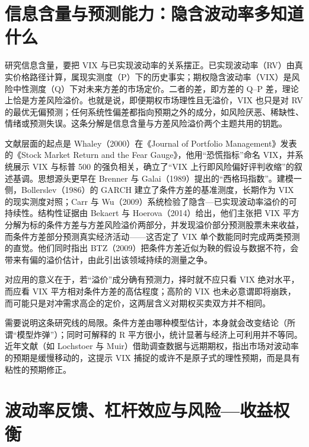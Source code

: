 \documentclass[11pt,a4paper]{ctexart}
\begin{document}
\section{信息含量与预测能力：隐含波动率多知道什么}

研究信息含量，要把 VIX 与已实现波动率的关系摆正。已实现波动率（RV）由真实价格路径计算，属现实测度（P）下的历史事实；期权隐含波动率（VIX）是风险中性测度（Q）下对未来方差的市场定价。二者的差，即方差的 Q–P 差，理论上恰是方差风险溢价。也就是说，即便期权市场理性且无溢价，VIX 也只是对 RV 的最优无偏预测；任何系统性偏差都指向预期之外的成分，如风险厌恶、稀缺性、情绪或预测失误。这条分解是信息含量与方差风险溢价两个主题共用的钥匙。

文献层面的起点是 Whaley（2000）在《Journal of Portfolio Management》发表的《Stock Market Return and the Fear Gauge》，他用“恐慌指标”命名 VIX，并系统展示 VIX 与标普 500 的强负相关，确立了“VIX 上行即风险偏好评判收缩”的叙述基调。思想源头更早在 Brenner 与 Galai（1989）提出的“西格玛指数”。建模一侧，Bollerslev（1986）的 GARCH 建立了条件方差的基准测度，长期作为 VIX 的现实测度对照；Carr 与 Wu（2009）系统检验了隐含—已实现波动率溢价的可持续性。结构性证据由 Bekaert 与 Hoerova（2014）给出，他们主张把 VIX 平方分解为标的条件方差与方差风险溢价两部分，并发现溢价部分预测股票未来收益，而条件方差部分预测真实经济活动——这否定了 VIX 单个数能同时完成两类预测的直觉。他们同时指出 BTZ（2009）把条件方差近似为鞅的假设与数据不符，会带来有偏的溢价估计，由此引出该领域持续的测量之争。

对应用的意义在于，若“溢价”成分确有预测力，择时就不应只看 VIX 绝对水平，而应看 VIX 平方相对条件方差的高估程度；高阶的 VIX 也未必意谓即将崩跌，而可能只是对冲需求高企的定价，这两层含义对期权买卖双方并不相同。

需要说明这条研究线的局限。条件方差由哪种模型估计，本身就会改变结论（所谓“模型炸弹”）；同时可解释的 R 平方很小，统计显著与经济上可利用并不等同。近年文献（如 Lochstoer 与 Muir）借助调查数据与远期期权，指出市场对波动率的预期是缓慢移动的，这提示 VIX 捕捉的或许不是原子式的理性预期，而是具有粘性的预期修正。

\section{波动率反馈、杠杆效应与风险—收益权衡}
\end{document}
